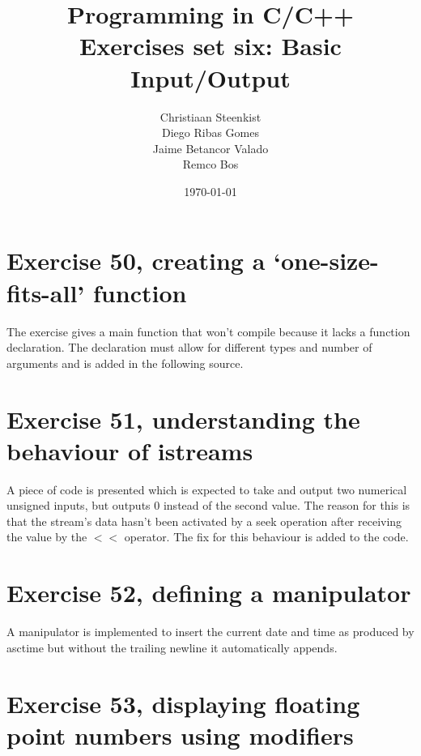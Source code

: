 \documentclass[11pt]{article}
\begin{document}
\title{Programming in C/C++ \\
       Exercises set six: Basic Input/Output
}
\date{\today}
\author{Christiaan Steenkist \\
Diego Ribas Gomes \\
Jaime Betancor Valado \\
Remco Bos \\
}

\maketitle

\section*{Exercise 50, creating a `one-size-fits-all' function}

The exercise gives a main function that won't compile because it lacks a function declaration. The declaration must allow for different types and number of arguments and is added in the following source.



\section*{Exercise 51, understanding the behaviour of istreams}

A piece of code is presented which is expected to take and output two numerical unsigned inputs, but outputs 0 instead of the second value. The reason for this is that the stream's data hasn't been activated by a seek operation after receiving the value by the $<$$<$ operator. The fix for this behaviour is added to the code.



\section*{Exercise 52, defining a manipulator}

A manipulator is implemented to insert the current date and time as produced by asctime but without the trailing newline it automatically appends.



\section*{Exercise 53, displaying floating point numbers using modifiers}
\end{document}
